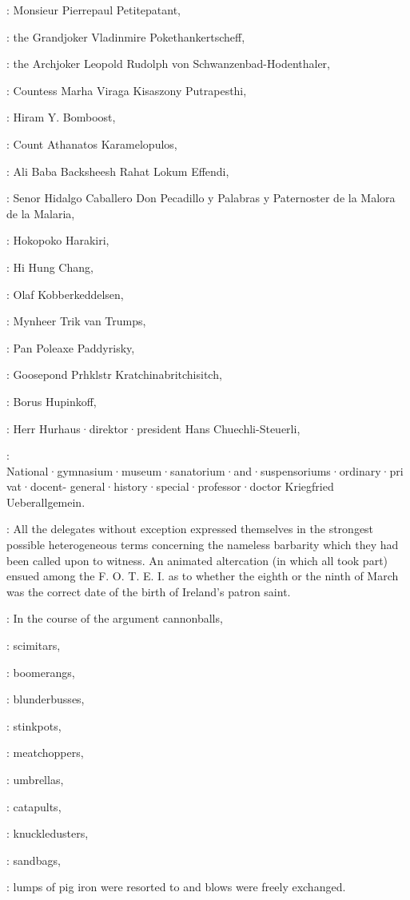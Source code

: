 :
Monsieur Pierrepaul Petitepatant,

:
the Grandjoker Vladinmire Pokethankertscheff,

:
the Archjoker Leopold Rudolph von Schwanzenbad-Hodenthaler,

:
Countess Marha Viraga Kisaszony Putrapesthi,

:
Hiram Y. Bomboost,

:
Count Athanatos Karamelopulos,

:
Ali Baba Backsheesh Rahat Lokum Effendi, 

:
Senor Hidalgo Caballero Don Pecadillo y Palabras y Paternoster de la Malora de la Malaria, 

:
Hokopoko Harakiri, 

:
Hi Hung Chang, 

:
Olaf Kobberkeddelsen, 

:
Mynheer Trik van Trumps, 

:
Pan Poleaxe Paddyrisky, 

:
Goosepond Prhklstr Kratchinabritchisitch, 

:
Borus Hupinkoff, 

:
Herr Hurhaus·direktor·president Hans Chuechli-Steuerli, 

:
National·gymnasium·museum·sanatorium·and·suspensoriums·ordinary·privat·docent-
general·history·special·professor·doctor Kriegfried Ueberallgemein.

:
All the delegates without exception expressed themselves
in the strongest possible heterogeneous terms
concerning the nameless
barbarity which they had been called upon to witness. An animated
altercation (in which all took part) ensued among the F. O. T. E. I.
as to whether the eighth or the ninth of March was the correct
date of the birth of Ireland's patron saint.

:
In the course of the argument cannonballs,

:
scimitars,

:
boomerangs, 

:
blunderbusses, 

:
stinkpots, 

:
meatchoppers, 

:
umbrellas, 

:
catapults, 

:
knuckledusters, 

:
sandbags, 

:
lumps of pig iron were resorted to and blows were freely exchanged.

